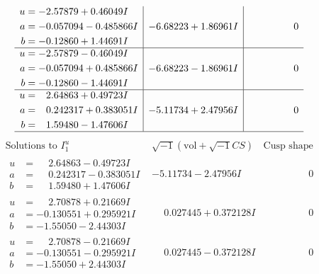 \documentclass[1p]{elsarticle_modified}
\theoremstyle{definition}
\newcommand{\I}{\sqrt{-1}}
\begin{document}
$$\begin{array}{c|c|c}
\begin{aligned}
u &= -2.57879 + 0.46049 I \\
a &= -0.057094 - 0.485866 I \\
b &= -0.12860 + 1.44691 I\end{aligned}
 & -6.68223 + 1.86961 I & \phantom{-0.000000 } 0 \\ \hline\begin{aligned}
u &= -2.57879 - 0.46049 I \\
a &= -0.057094 + 0.485866 I \\
b &= -0.12860 - 1.44691 I\end{aligned}
 & -6.68223 - 1.86961 I & \phantom{-0.000000 } 0 \\ \hline\begin{aligned}
u &= \phantom{-}2.64863 + 0.49723 I \\
a &= \phantom{-}0.242317 + 0.383051 I \\
b &= \phantom{-}1.59480 - 1.47606 I\end{aligned}
 & -5.11734 + 2.47956 I & \phantom{-0.000000 } 0\\
 \hline 
 \end{array}$$\newpage$$\begin{array}{c|c|c}  
\text{Solutions to }I^u_{1}& \I (\text{vol} + \sqrt{-1}CS) & \text{Cusp shape}\\
 \hline 
\begin{aligned}
u &= \phantom{-}2.64863 - 0.49723 I \\
a &= \phantom{-}0.242317 - 0.383051 I \\
b &= \phantom{-}1.59480 + 1.47606 I\end{aligned}
 & -5.11734 - 2.47956 I & \phantom{-0.000000 } 0 \\ \hline\begin{aligned}
u &= \phantom{-}2.70878 + 0.21669 I \\
a &= -0.130551 + 0.295921 I \\
b &= -1.55050 - 2.44303 I\end{aligned}
 & \phantom{-}0.027445 + 0.372128 I & \phantom{-0.000000 } 0 \\ \hline\begin{aligned}
u &= \phantom{-}2.70878 - 0.21669 I \\
a &= -0.130551 - 0.295921 I \\
b &= -1.55050 + 2.44303 I\end{aligned}
 & \phantom{-}0.027445 - 0.372128 I & \phantom{-0.000000 } 0 \\ \hline\begin{aligned}

\end{aligned}
\end{array}$$
\end{document}
